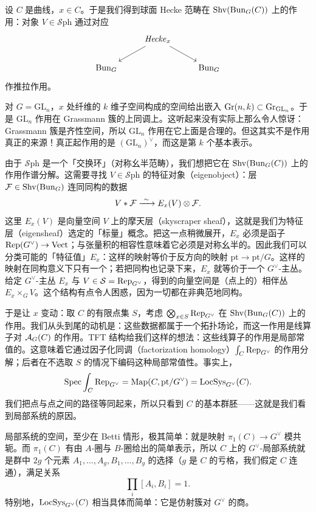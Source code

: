 
设 $C$ 是曲线，$x\in C$。于是我们得到球面 Hecke 范畴在 $\mathrm{Shv}(\mathrm{Bun}_G(C))$ 上的作用：对象 $V\in\mathcal{S}\mathrm{ph}$ 通过对应
\[
\begin{tikzcd}
& \Hck_x \arrow[dl] \arrow[dr] & \\
\BunG & & \BunG
\end{tikzcd}
\]
作推拉作用。

对 $G=\mathrm{GL}_n$，$x$ 处纤维的 $k$ 维子空间构成的空间给出嵌入 $\mathrm{Gr}(n,k)\subset\mathrm{Gr}_{\mathrm{GL}_n}$。于是 $\mathrm{GL}_n$ 作用在 Grassmann 簇的上同调上。这听起来没有实际上那么令人惊讶：Grassmann 簇是齐性空间，所以 $\mathrm{GL}_n$ 作用在它上面是合理的。但这其实不是作用真正的来源！真正起作用的是 $(\mathrm{GL}_n)^\vee$，而这是第 $k$ 个基本表示。

由于 $\mathcal{S}\mathrm{ph}$ 是一个「交换环」（对称幺半范畴），我们想把它在 $\mathrm{Shv}(\mathrm{Bun}_G(C))$ 上的作用作谱分解。这需要寻找 $V\in\mathcal{S}\mathrm{ph}$ 的特征对象（eigenobject）：层 $\mathcal{F}\in\mathrm{Shv}(\mathrm{Bun}_G)$ 连同同构的数据
\[
V*\mathcal{F}\xrightarrow{\ \sim\ } E_x(V)\otimes \mathcal{F}.
\]
这里 $E_x(V)$ 是向量空间 $V$ 上的摩天层（skyscraper sheaf），这就是我们为特征层（eigensheaf）选定的「标量」概念。把这一点稍微展开，$E_x$ 必须是函子 $\operatorname{Rep}(G^\vee)\to\mathrm{Vect}$；与张量积的相容性意味着它必须是对称幺半的。因此我们可以分类可能的「特征值」$E_x$：这样的映射等价于反方向的映射 $\mathrm{pt}\to\mathrm{pt}/G$。这样的映射在同构意义下只有一个；若把同构也记录下来，$E_x$ 就等价于一个 $G^\vee$-主丛。给定 $G^\vee$-主丛 $E_x$ 与 $V\in\mathcal{S}=\operatorname{Rep}_{G^\vee}$，得到的向量空间是（点上的）相伴丛 $E_x\times_G V$。这个结构有点令人困惑，因为一切都在非典范地同构。

于是让 $x$ 变动：取 $C$ 的有限点集 $S$，考虑 $\bigotimes_{x\in S}\operatorname{Rep}_{G^\vee}$ 在 $\mathrm{Shv}(\mathrm{Bun}_G(C))$ 上的作用。我们从头到尾的动机是：这些数据都属于一个拓扑场论，而这一作用是线算子对 $\mathcal{A}_G(C)$ 的作用。TFT 结构给我们这样的想法：这些线算子的作用是局部常值的。这意味着它通过因子化同调（factorization homology）$\int_C\operatorname{Rep}_{G^\vee}$ 的作用分解；后者在不选取 $S$ 的情况下编码这种局部常值性。事实上，
\[
\operatorname{Spec}\int_C \operatorname{Rep}_{G^\vee}=\mathrm{Map}(C,\mathrm{pt}/G^\vee)=\mathrm{LocSys}_{G^\vee}(C).
\]
我们把点与点之间的路径等同起来，所以只看到 $C$ 的基本群胚——这就是我们看到局部系统的原因。

\begin{remark}
局部系统的空间，至少在 Betti 情形，极其简单：就是映射 $\pi_1(C)\to G^\vee$ 模共轭。而 $\pi_1(C)$ 有由 $A$-圈与 $B$-圈给出的简单表示，所以 $C$ 上的 $G^\vee$-局部系统就是群中 $2g$ 个元素 $A_1,\dots,A_g,B_1,\dots,B_g$ 的选择（$g$ 是 $C$ 的亏格，我们假定 $C$ 连通），满足关系
\[
\prod_i [A_i,B_i]=1.
\]
特别地，$\mathrm{LocSys}_{G^\vee}(C)$ 相当具体而简单：它是仿射簇对 $G^\vee$ 的商。
\end{remark}

